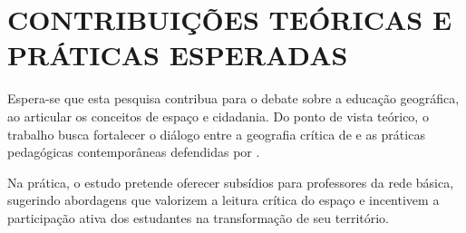 \chapter{CONTRIBUIÇÕES TEÓRICAS E PRÁTICAS ESPERADAS}

Espera-se que esta pesquisa contribua para o debate sobre a educação geográfica, ao articular os conceitos de espaço e cidadania. Do ponto de vista teórico, o trabalho busca fortalecer o diálogo entre a geografia crítica de \cite{milton-ne} e as práticas pedagógicas contemporâneas defendidas por \cite{tec-ensi-pqn}.

Na prática, o estudo pretende oferecer subsídios para professores da rede básica, sugerindo abordagens que valorizem a leitura crítica do espaço e incentivem a participação ativa dos estudantes na transformação de seu território.